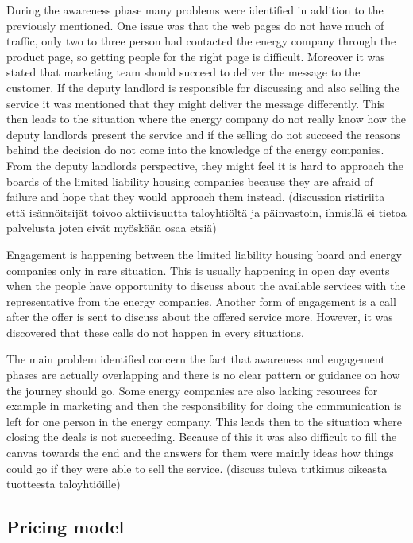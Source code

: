 During the awareness phase many problems were identified in addition to the previously mentioned. One issue was that the web pages do not have much of traffic, only two to three person had contacted the energy company through the product page, so getting people for the right page is difficult. Moreover it was stated that marketing team should succeed to deliver the message to the customer. If the deputy landlord is responsible for discussing and also selling the service it was mentioned that they might deliver the message differently. This then leads to the situation where the energy company do not really know how the deputy landlords present the service and if the selling do not succeed the reasons behind the decision do not come into the knowledge of the energy companies. From the deputy landlords perspective, they might feel it is hard to approach the boards of the limited liability housing companies because they are afraid of failure and hope that they would approach them instead. (discussion ristiriita että isännöitsijät toivoo aktiivisuutta taloyhtiöltä ja päinvastoin, ihmisllä ei tietoa palvelusta joten eivät myöskään osaa etsiä)

Engagement is happening between the limited liability housing board and energy companies only in rare situation. This is usually happening in open day events when the people have opportunity to discuss about the available services with the representative from the energy companies. Another form of engagement is a call after the offer is sent to discuss about the offered service more. However, it was discovered that these calls do not happen in every situations.

The main problem identified concern the fact that awareness and engagement phases are actually overlapping and there is no clear pattern or guidance on how the journey should go. Some energy companies are also lacking resources for example in marketing and then the responsibility for doing the communication is left for one person in the energy company. This leads then to the situation where closing the deals is not succeeding. Because of this it was also difficult to fill the canvas towards the end and the answers for them were mainly ideas how things could go if they were able to sell the service. (discuss tuleva tutkimus oikeasta tuotteesta taloyhtiöille)

\subsection{Pricing model}

